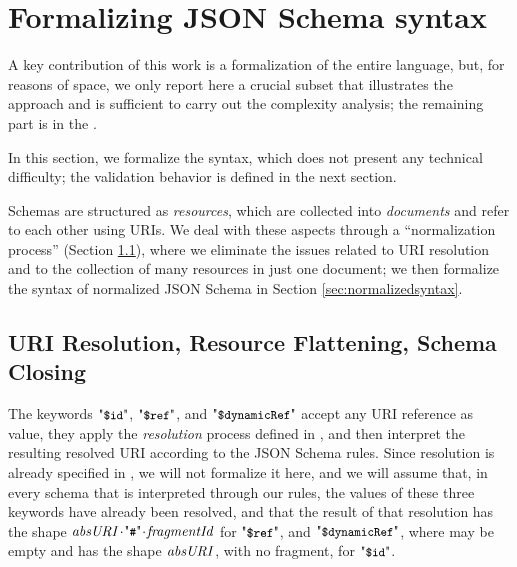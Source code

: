\section{Formalizing JSON Schema syntax}\label{sec:syntax}


A key contribution of this work is a formalization of the entire {\mJS} language, but, 
for reasons of space, we only report here a crucial subset that illustrates the approach and is sufficient to carry out
the complexity analysis; the remaining part is in the {\FV}.

In this section, we formalize the syntax, which does not present any technical difficulty; the validation behavior is
defined in the next section.

Schemas are structured as \emph{resources}, which are collected into \emph{documents} and refer to each other using URIs.
We deal with these aspects through a ``normalization process'' (Section \ref{sec:URI}), where we eliminate the issues related
to URI resolution and to the collection of many resources in just one document; we then formalize the syntax of normalized JSON Schema in Section \ref{sec:normalizedsyntax}.




\subsection{URI Resolution, Resource Flattening, Schema Closing}\label{sec:URI}



The keywords $\qdid$, $\qdref$, and $\qddref$ accept any URI reference as value, they apply the \emph{resolution} process defined in 
\citep{RFC3986}, and then interpret the resulting resolved URI according to the JSON Schema rules. Since resolution is already specified in \citep{RFC3986}, we will not formalize it here, and we will assume that, in every schema that is interpreted through our rules,
the values of these three keywords have already been resolved, and that the result of that resolution has the shape
$\UU\catHash\key{fragmentId}$ for $\qdref$, and $\qddref$, where  may be empty
and has the shape $\mathit{absURI}$, with no fragment,
for $\qdid$.

